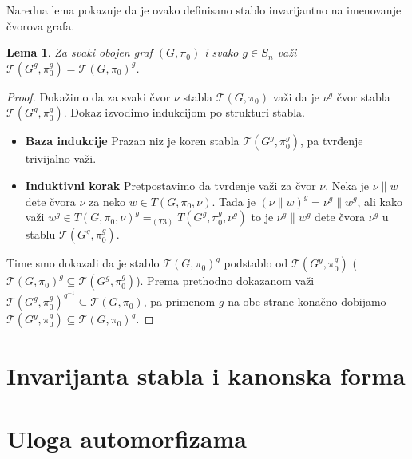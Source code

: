 \documentclass[12pt,oneside]{memoir}
\newtheorem{lemma}{Lema}
\theoremstyle{definition}
\begin{document}

 Naredna lema pokazuje da je ovako definisano stablo invarijantno na imenovanje
 čvorova grafa.

 \begin{lemma}
	 Za svaki obojen graf $(G, \pi_0)$ i svako $g \in S_n$ važi
	 $\mathcal{T}(G^g, \pi_0^g) = \mathcal{T}(G, \pi_0)^g$.
 \end{lemma}

 \begin{proof}
	 Dokažimo da za svaki čvor $\nu$ stabla $\mathcal{T}(G, \pi_0)$ važi da je
	 $\nu^g$ čvor stabla $\mathcal{T}(G^g, \pi_0^g)$. Dokaz izvodimo indukcijom
	 po strukturi stabla.
	 \begin{itemize}
		 \item[] \textbf{Baza indukcije} Prazan niz je koren stabla
			 $\mathcal{T}(G^g, \pi_0^g)$, pa tvrđenje trivijalno važi.
		 \item[] \textbf{Induktivni korak} Pretpostavimo da tvrđenje važi za
			 čvor $\nu$. Neka je $\nu \| w$ dete čvora $\nu$ za neko $w \in
			 T(G, \pi_0, \nu)$. Tada je $(\nu \| w)^g = \nu^g \| w^g$, ali kako
			 važi $w^g \in T(G, \pi_0, \nu)^g =_{(T3)} T(G^g, \pi_0^g, \nu^g)$
			 to je $\nu^g \| w^g$ dete čvora $\nu^g$ u stablu $\mathcal{T}(G^g,
			 \pi_0^g)$.
	 \end{itemize}
	 Time smo dokazali da je stablo $\mathcal{T}(G, \pi_0)^g$ podstablo od
	 $\mathcal{T}(G^g, \pi_0^g)$ ($\mathcal{T}(G, \pi_0)^g \subseteq
	 \mathcal{T}(G^g, \pi_0^g)$). Prema prethodno dokazanom važi
	 $\mathcal{T}(G^g, \pi_0^g)^{g^{-1}} \subseteq \mathcal{T}(G, \pi_0)$, pa
	 primenom $g$ na obe strane konačno dobijamo $\mathcal{T}(G^g, \pi_0^g)
	 \subseteq \mathcal{T}(G, \pi_0)^g$.
 \end{proof}


 \section{Invarijanta stabla i kanonska forma}

 \section{Uloga automorfizama}

\end{document}
